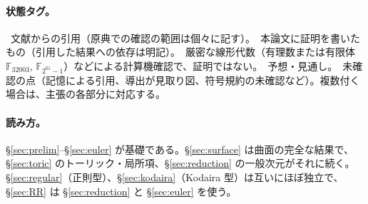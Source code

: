 \paragraph{状態タグ。}\tC\ 文献からの引用（原典での確認の範囲は個々に記す）。\tP\ 本論文に証明を書いたもの（引用した結果への依存は明記）。\tV\ 厳密な線形代数（有理数または有限体 $\mathbb F_{32003}$, $\mathbb F_{2^{61}-1}$）などによる計算機確認で、証明ではない。\tK\ 予想・見通し。\tQ\ 未確認の点（記憶による引用、導出が見取り図、符号規約の未確認など）。複数付く場合は、主張の各部分に対応する。

\paragraph{読み方。}\S\ref{sec:prelim}--\S\ref{sec:euler} が基礎である。\S\ref{sec:surface} は曲面の完全な結果で、\S\ref{sec:toric} のトーリック・局所項、\S\ref{sec:reduction} の一般次元がそれに続く。\S\ref{sec:regular}（正則型）、\S\ref{sec:kodaira}（Kodaira 型）は互いにほぼ独立で、\S\ref{sec:RR} は \S\ref{sec:reduction} と \S\ref{sec:euler} を使う。

